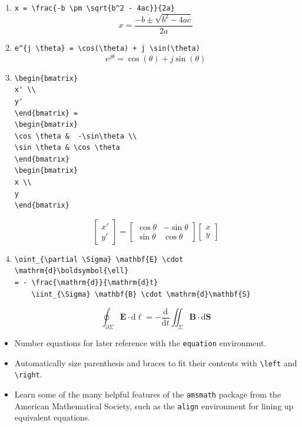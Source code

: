 \begin{enumerate}
\item \verb|x = \frac{-b \pm \sqrt{b^2 - 4ac}}{2a}|
    \[x = \frac{-b \pm \sqrt{b^2 - 4 a c}}{2a} \]

\item \verb|e^{j \theta} = \cos(\theta) + j \sin(\theta)|
    \[e^{j \theta} = \cos(\theta) + j \sin(\theta)\]

\item
\begin{verbatim}
\begin{bmatrix}
x' \\
y'
\end{bmatrix} =
\begin{bmatrix}
\cos \theta &  -\sin\theta \\
\sin \theta & \cos \theta
\end{bmatrix}
\begin{bmatrix}
x \\
y
\end{bmatrix}
\end{verbatim}
\[
\begin{bmatrix}
x' \\
y'
\end{bmatrix} =
\begin{bmatrix}
\cos \theta &  -\sin\theta \\
\sin \theta & \cos \theta
\end{bmatrix}
\begin{bmatrix}
x \\
y
\end{bmatrix}
\]

\item
\begin{verbatim}
\oint_{\partial \Sigma} \mathbf{E} \cdot
\mathrm{d}\boldsymbol{\ell}
= - \frac{\mathrm{d}}{\mathrm{d}t}
    \iint_{\Sigma} \mathbf{B} \cdot \mathrm{d}\mathbf{S}
\end{verbatim}
    \[\oint_{\partial \Sigma} \mathbf{E} \cdot \mathrm{d}\boldsymbol{\ell}  = - \frac{\mathrm{d}}{\mathrm{d}t} \iint_{\Sigma} \mathbf{B} \cdot \mathrm{d}\mathbf{S}\]
\end{enumerate}

\exercises{}
\begin{itemize}
\item Number equations for later reference with the \texttt{equation} environment.
\item Automatically size parenthesis and braces to fit their contents
    with \verb|\left| and \verb|\right|.
\item Learn some of the many helpful features of the \texttt{amsmath}
    package from the American Mathematical Society,
    such as the \texttt{align} environment for lining up
    equivalent equations.
\end{itemize}
